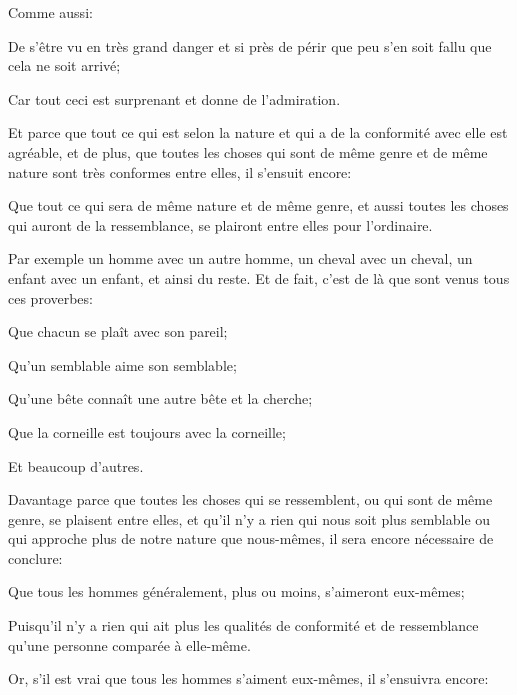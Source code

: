Comme aussi:

\begin{lieu}
	De s'être vu en très grand danger et si près de périr que peu s'en soit fallu que cela ne soit arrivé;
\end{lieu}

Car tout ceci est surprenant et donne de l'admiration.

\bigbreak

Et parce que tout ce qui est selon la nature et qui a de la conformité avec elle est agréable, et de plus, que
toutes les choses qui sont de même genre et de même nature sont très conformes entre elles, il s'ensuit encore:

\begin{lieu}
	Que tout ce qui sera de même nature et de même genre, et aussi toutes les choses qui auront de la ressemblance,
	se plairont entre elles pour l'ordinaire. 
\end{lieu}

Par exemple un homme avec un autre homme, un cheval avec un cheval, un enfant avec un enfant, et ainsi du reste.
Et de fait, c'est de là que sont venus tous ces proverbes:

\begin{emphpar}
	Que chacun se plaît avec son pareil;

	Qu'un semblable aime son semblable;

	Qu'une bête connaît une autre bête et la cherche;

	Que la corneille est toujours avec la corneille;
\end{emphpar}

Et beaucoup d'autres.

\bigbreak

Davantage parce que toutes les choses qui se ressemblent, ou qui sont de même genre, se plaisent entre elles,
et qu'il n'y a rien qui nous soit plus semblable ou qui approche plus de notre nature que nous-mêmes, il sera
encore nécessaire de conclure:

\begin{lieu}
	Que tous les hommes généralement, plus ou moins, s'aimeront eux-mêmes;
\end{lieu}

Puisqu'il n'y a rien qui ait plus les qualités de conformité et de ressemblance qu'une personne comparée à
elle-même.

\bigbreak

Or, s'il est vrai que tous les hommes s'aiment eux-mêmes, il s'ensuivra encore:

